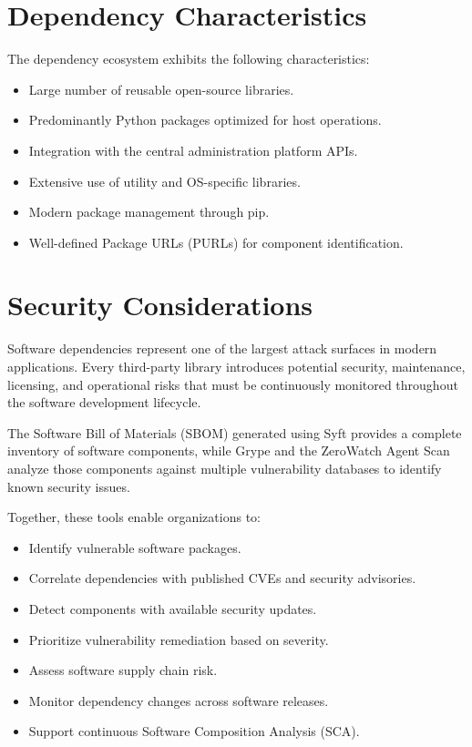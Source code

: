 
\section{Dependency Characteristics}

The dependency ecosystem exhibits the following characteristics:
\begin{itemize}
\item Large number of reusable open-source libraries.
\item Predominantly Python packages optimized for host operations.
\item Integration with the central administration platform APIs.
\item Extensive use of utility and OS-specific libraries.
\item Modern package management through pip.
\item Well-defined Package URLs (PURLs) for component identification.
\end{itemize}

\vspace{0.4cm}


\section{Security Considerations}

Software dependencies represent one of the largest attack surfaces in modern applications. Every third-party library introduces potential security, maintenance, licensing, and operational risks that must be continuously monitored throughout the software development lifecycle.

The Software Bill of Materials (SBOM) generated using Syft provides a complete inventory of software components, while Grype and the ZeroWatch Agent Scan analyze those components against multiple vulnerability databases to identify known security issues.

Together, these tools enable organizations to:
\begin{itemize}
\item Identify vulnerable software packages.
\item Correlate dependencies with published CVEs and security advisories.
\item Detect components with available security updates.
\item Prioritize vulnerability remediation based on severity.
\item Assess software supply chain risk.
\item Monitor dependency changes across software releases.
\item Support continuous Software Composition Analysis (SCA).
\end{itemize}

